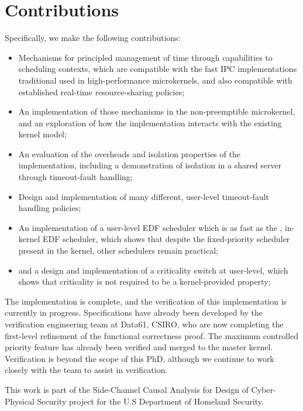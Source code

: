 \section{Contributions}

Specifically, we make the following contributions:

\begin{itemize}
    \item Mechanisms for principled management of time through capabilities to scheduling contexts,
        which are compatible with the fast IPC implementations traditional used in high-performance
        microkernels, and also compatible with established real-time resource-sharing policies;
    \item An implementation of those mechanisms in the non-preemptible \selfour microkernel, and an
        exploration of how the implementation interacts with the existing kernel model;
    \item An evaluation of the overheads and isolation properties of the implementation, including
        a demonstration of isolation in a shared server through timeout-fault handling;
    \item Design and implementation of many different, user-level timeout-fault handling policies;
    \item An implementation of a user-level \gls{EDF} scheduler which is as fast as the
        \litmus, in-kernel EDF scheduler, which shows that despite the fixed-priority scheduler
        present in the kernel, other schedulers remain practical;
    \item and a design and implementation of a criticality switch at user-level, which shows that
        criticality is not required to be a kernel-provided property;
\end{itemize}

The implementation is complete, and the verification of this implementation is currently in progress.
Specifications have already been developed by the verification engineering team at Data61, CSIRO,
who are now completing the first-level refinement of the functional correctness proof.
The maximum controlled priority feature has already been verified and merged to the master kernel. 
Verification is beyond the scope of this PhD, although we continue to work closely with
the team to assist in verification. 

This work is part of
the Side-Channel Causal Analysis for Design of Cyber-Physical Security project for the U.S
Department of Homeland Security.

